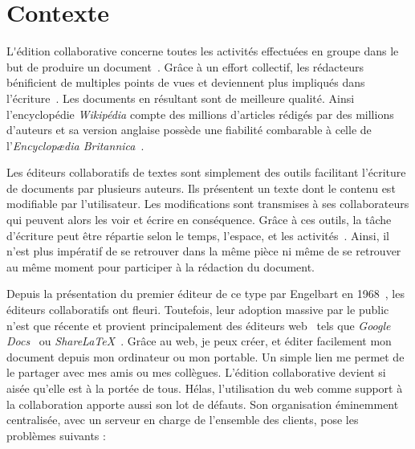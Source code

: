 
\section{Contexte}

\lettrine{L}'édition collaborative concerne toutes les activités effectuées en
groupe dans le but de produire un document~\cite{ellis1989concurrency,
  johansen1988groupware}. Grâce à un effort collectif, les rédacteurs
bénificient de multiples points de vues et deviennent plus impliqués dans
l'écriture~\cite{noel2004empirical}. Les documents en résultant sont de
meilleure qualité. Ainsi l'encyclopédie \emph{Wikipédia} compte des millions
d'articles rédigés par des millions d'auteurs et sa version anglaise possède une
fiabilité combarable à celle de l'\emph{Encyclopædia
  Britannica}~\cite{giles2005internet}.

Les éditeurs collaboratifs de textes sont simplement des outils facilitant
l'écriture de documents par plusieurs auteurs. Ils présentent un texte dont le
contenu est modifiable par l'utilisateur. Les modifications sont transmises à
ses collaborateurs qui peuvent alors les voir et écrire en conséquence. Grâce à
ces outils, la tâche d'écriture peut être répartie selon le temps, l'espace, et
les activités~\cite{desanctis1987foundation, grudin1994computersupported,
  johansen1988groupware}. Ainsi, il n'est plus impératif de se retrouver dans la
même pièce ni même de se retrouver au même moment pour participer à la rédaction
du document.

Depuis la présentation du premier éditeur de ce type par Engelbart en
1968~\cite{engelbart1968research}, les éditeurs collaboratifs ont
fleuri. Toutefois, leur adoption massive par le public n'est que récente et
provient principalement des éditeurs web~\cite{mogan2010impact,
  perkel2014scientific} tels que \emph{Google Docs}~\cite{googledocs} ou
\emph{ShareLaTeX}~\cite{sharelatex}. Grâce au web, je peux créer, et éditer
facilement mon document depuis mon ordinateur ou mon portable. Un simple lien me
permet de le partager avec mes amis ou mes collègues. L'édition collaborative
devient si aisée qu'elle est à la portée de tous. Hélas, l'utilisation du web
comme support à la collaboration apporte aussi son lot de défauts. Son
organisation éminemment centralisée, avec un serveur en charge de l'ensemble des
clients, pose les problèmes suivants :

